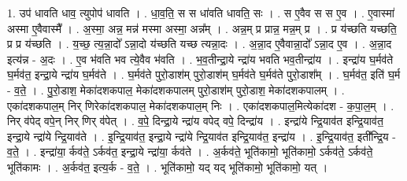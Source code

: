 \documentclass[17pt]{extarticle}
\begin{document}
1. उप॑ धावति धाव॒ त्युपोप॑ धावति । . धा॒व॒ति॒ स स धा॑वति धावति॒ सः । . स ए॒वैव स स ए॒व । . ए॒वास्मा॑ अस्मा ए॒वैवास्मै᳚ । . अ॒स्मा॒ अन्न॒ मन्न॑ मस्मा अस्मा॒ अन्न᳚म् । . अन्न॒म् प्र प्रान्न॒ मन्न॒म् प्र । . प्र य॑च्छति यच्छति॒ प्र प्र य॑च्छति । . य॒च्छ॒ त्य॒न्ना॒दो᳚ ऽन्ना॒दो य॑च्छति यच्छ त्यन्ना॒दः । . अ॒न्ना॒द ए॒वैवान्ना॒दो᳚ ऽन्ना॒द ए॒व । . अ॒न्ना॒द इत्य॑न्न - अ॒दः । . ए॒व भ॑वति भव त्ये॒वैव भ॑वति । . भ॒व॒तीन्द्रा॒ये न्द्रा॑य भवति भव॒तीन्द्रा॑य । . इन्द्रा॑य घ॒र्मव॑ते घ॒र्मव॑त॒ इन्द्रा॒ये न्द्रा॑य घ॒र्मव॑ते । . घ॒र्मव॑ते पुरो॒डाश॑म् पुरो॒डाश॑म् घ॒र्मव॑ते घ॒र्मव॑ते पुरो॒डाश᳚म् । . घ॒र्मव॑त॒ इति॑ घ॒र्म - व॒ते॒ । . पु॒रो॒डाश॒ मेका॑दशकपाल॒ मेका॑दशकपालम् पुरो॒डाश॑म् पुरो॒डाश॒ मेका॑दशकपालम् । . एका॑दशकपाल॒म् निर् णिरेका॑दशकपाल॒ मेका॑दशकपाल॒म् निः । . एका॑दशकपाल॒मित्येका॑दश - क॒पा॒ल॒म् । . निर् व॑पेद् वपे॒न् निर् णिर् व॑पेत् । . व॒पे॒ दिन्द्रा॒ये न्द्रा॑य वपेद् वपे॒ दिन्द्रा॑य । . इन्द्रा॑ये न्द्रि॒याव॑त इन्द्रि॒याव॑त॒ इन्द्रा॒ये न्द्रा॑ये न्द्रि॒याव॑ते । . इ॒न्द्रि॒याव॑त॒ इन्द्रा॒ये न्द्रा॑ये न्द्रि॒याव॑त इन्द्रि॒याव॑त॒ इन्द्रा॑य । . इ॒न्द्रि॒याव॑त॒ इती᳚न्द्रि॒य - व॒ते॒ । . इन्द्रा॑या॒ र्कव॑ते॒ ऽर्कव॑त॒ इन्द्रा॒ये न्द्रा॑या॒ र्कव॑ते । . अ॒र्कव॑ते॒ भूति॑कामो॒ भूति॑कामो॒ ऽर्कव॑ते॒ ऽर्कव॑ते॒ भूति॑कामः । . अ॒र्कव॑त॒ इत्य॒र्क - व॒ते॒ । . भूति॑कामो॒ यद् यद् भूति॑कामो॒ भूति॑कामो॒ यत् । \newline
\end{document}
